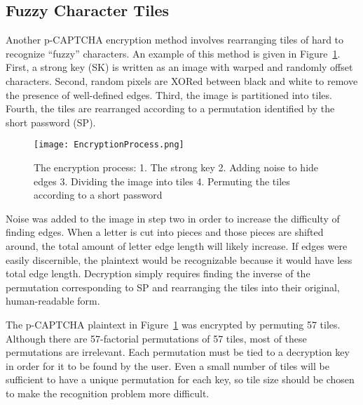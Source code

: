 \documentclass[12pt]{article}
\begin{document}
\subsection*{Fuzzy Character Tiles}
	Another p-CAPTCHA encryption method involves rearranging tiles of hard to recognize “fuzzy” characters. An example of this method is given in Figure~{\ref{EncryptionProcess}}. First, a strong key (SK) is written as an image with warped and randomly offset characters. Second, random pixels are XORed between black and white to remove the presence of well-defined edges. Third, the image is partitioned into tiles. Fourth, the tiles are rearranged according to a permutation identified by the short password (SP).

\begin{figure}
	\begin{center}
		\texttt{[image: EncryptionProcess.png]}
	\end{center}
	\caption{The encryption process: 1. The strong key 2. Adding noise to hide edges 3. Dividing the image into tiles 4. Permuting the tiles according to a short password}
\label{EncryptionProcess}
\end{figure}

Noise was added to the image in step two in order to increase the difficulty of finding edges. When a letter is cut into pieces and those pieces are shifted around, the total amount of letter edge length will likely increase. If edges were easily discernible, the plaintext would be recognizable because it would have less total edge length. Decryption simply requires finding the inverse of the permutation corresponding to SP and rearranging the tiles into their original, human-readable form.

The p-CAPTCHA plaintext in Figure~{\ref{EncryptionProcess}} was encrypted by permuting 57 tiles. Although there are 57-factorial permutations of 57 tiles, most of these permutations are irrelevant. Each permutation must be tied to a decryption key in order for it to be found by the user. Even a small number of tiles will be sufficient to have a unique permutation for each key, so tile size should be chosen to make the recognition problem more difficult.
\end{document}
